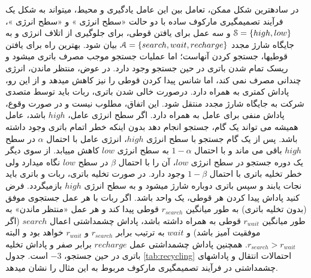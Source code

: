 در ساده\nf ترین شکل ممکن، تعامل بین این عامل یادگیری و محیط، می\nf تواند به شکل یک فرآیند تصمیم\nf گیری مارکوف ساده با دو حالت «سطح انرژی » و «سطح انرژی »، 
${\EuScript{S} = \{high, low\}}$ 
و سه عمل  برای یافتن قوطی،  برای جلوگیری از اتلاف انرژی و  به جایگاه شارژ مجدد 
$\EuScript{A}=\{search, wait, recharge\}$
بیان شود. بهترین راه برای یافتن قوطی\nf ها، جستجو کردن آن\nf هاست؛ اما عملیات جستجو موجب مصرف باتری می\nf شود و ریسک تمام شدن باتری در حین جستجو وجود دارد. در عوض، منتظر ماندن، انرژی چندانی مصرف نمی کند، اما شانس پیدا کردن قوطی را نیز کاهش می\nf دهد و از این رو، پاداش کمتری به همراه دارد. درصورت خالی شدن باتری، ربات باید توسط متصدی شرکت به جایگاه شارژ مجدد منتقل شود. این اتفاق، مطلوب نیست و در صورت وقوع، پاداش منفی برای عامل به همراه دارد. 
اگر سطح انرژی عامل، $high$  باشد، عامل همیشه می تواند یک گام، جستجو انجام دهد بدون اینکه خطر اتمام باتری وجود داشته باشد.
پس از یک گام جستجو با سطح انرژی $high$، انرژی عامل با احتمال
 $\alpha$
 در سطح $high$ باقی می ماند و با احتمال 
 $1-\alpha$
 به سطح انرژی $low$ کاهش می\nf یابد. از سوی دیگر یک دوره
جستجو در سطح انرژی $low$، آن را با احتمال $\beta$ در سطح $low$ نگاه می\nf دارد ولی خطر تخلیه باتری با احتمال $1-\beta$ وجود دارد. در صورت تخلیه باتری، ربات و باتری باید نجات یابند و سپس باتری دوباره شارژ می\nf شود و به سطح انرژی $high$ بازمی\nf گردد. 
فرض کنید پاداش پیدا کردن هر قوطی، یک واحد باشد. اگر ربات با هر عمل جستجوی موفق (بدون تخلیه باتری) به طور میانگین $r_{search}$ قوطی پیدا کند و هر عمل «منتظر ماندن» به طور میانگین $r_{wait}$ قوطی به همراه داشته باشد، 
 پاداش چشمداشتی اعمال $search$ (اگر موفقیت آمیز باشد)  و $wait$ به ترتیب برابر $r_{search}$  و 
$r_{wait}$
خواهد بود و البته $r_{search} > r_{wait}$. همچنین پاداش چشمداشتی عمل 
   $recharge$
   برابر صفر و پاداش تخلیه باتری در حین جستجو، 
   $-3$
است. جدول 
\ref{tab:recycling}
 احتمالات انتقال و پاداش\nf های چشمداشتی در فرآیند تصمیم\nf گیری مارکوف مربوط به این مثال را نشان می\nf دهد.


